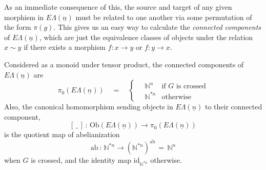 \documentclass{amsbook} %
\newcommand{\ELn}{E\Lambda(\underline{n})}
\numberwithin{section}{chapter}
\begin{document}
As an immediate consequence of this, the source and target of any given morphism in $\ELn$ must be related to one another via some permutation of the form $\pi(g)$. This gives us an easy way to calculate the \emph{connected components} of $\ELn$, which are just the equivalence classes of objects under the relation $x \sim y$ if there exists a morphism $f: x \to y$ or $f:y \to x$.
\begin{prop}\label{Gnconcomp} Considered as a monoid under tensor product, the connected components of $\ELn$ are
\[ \pi_0(\ELn) \quad = \quad \begin{cases}
							\quad \mathbb{N}^n & \text{if $G$ is crossed} \\
							\quad \mathbb{N}^{\ast n} & \text{otherwise}
							\end{cases}
 \] 
Also, the canonical homomorphism sending objects in $\ELn$ to their connected component,
\[ [ \, \_ \, ] \, : \, \mathrm{Ob}(\ELn) \to \pi_0(\ELn) \]
is the quotient map of abelianization
\[ \mathrm{ab} \, : \, \mathbb{N}^{*n} \to (\mathbb{N}^{*n})^{\mathrm{ab}} \, = \, \mathbb{N}^n \]
when $G$ is crossed, and the identity map $\mathrm{id}_{\mathbb{N}^{*n}}$ otherwise.
\end{prop}
\end{document}
